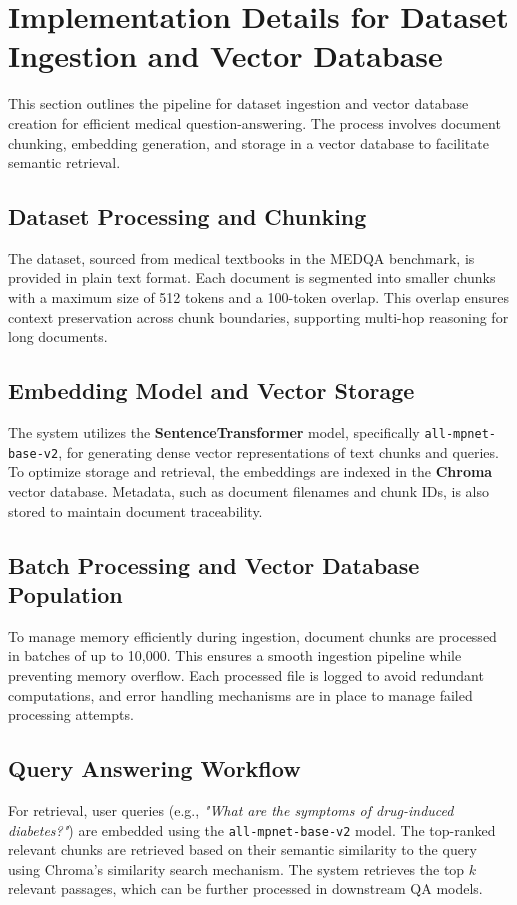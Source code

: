 
\section{Implementation Details for Dataset Ingestion and Vector Database}
\label{app:vector_db}

This section outlines the pipeline for dataset ingestion and vector database creation for efficient medical question-answering. The process involves document chunking, embedding generation, and storage in a vector database to facilitate semantic retrieval.

\subsection{Dataset Processing and Chunking}
The dataset, sourced from medical textbooks in the MEDQA benchmark, is provided in plain text format. Each document is segmented into smaller chunks with a maximum size of 512 tokens and a 100-token overlap. This overlap ensures context preservation across chunk boundaries, supporting multi-hop reasoning for long documents.

\subsection{Embedding Model and Vector Storage}
The system utilizes the \textbf{SentenceTransformer} model, specifically \texttt{all-mpnet-base-v2}, for generating dense vector representations of text chunks and queries. To optimize storage and retrieval, the embeddings are indexed in the \textbf{Chroma} vector database. Metadata, such as document filenames and chunk IDs, is also stored to maintain document traceability.

\subsection{Batch Processing and Vector Database Population}
To manage memory efficiently during ingestion, document chunks are processed in batches of up to 10,000. This ensures a smooth ingestion pipeline while preventing memory overflow. Each processed file is logged to avoid redundant computations, and error handling mechanisms are in place to manage failed processing attempts.

\subsection{Query Answering Workflow}
For retrieval, user queries (e.g., \textit{"What are the symptoms of drug-induced diabetes?"}) are embedded using the \texttt{all-mpnet-base-v2} model. The top-ranked relevant chunks are retrieved based on their semantic similarity to the query using Chroma's similarity search mechanism. The system retrieves the top \(k\) relevant passages, which can be further processed in downstream QA models.


